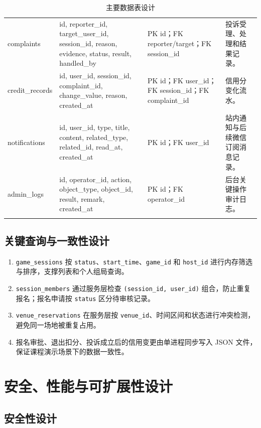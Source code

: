 \documentclass[a4paper]{article}
\begin{document}
\begin{longtable}{P{3.2cm} P{5.4cm} P{4.0cm} P{3.0cm}}
  complaints & id, reporter\_id, target\_user\_id, session\_id, reason, evidence, status, result, handled\_by & PK id；FK reporter/target；FK session\_id & 投诉受理、处理和结果记录。 \\
  credit\_records & id, user\_id, session\_id, complaint\_id, change\_value, reason, created\_at & PK id；FK user\_id；FK session\_id；FK complaint\_id & 信用分变化流水。 \\
  notifications & id, user\_id, type, title, content, related\_type, related\_id, read\_at, created\_at & PK id；FK user\_id & 站内通知与后续微信订阅消息记录。 \\
  admin\_logs & id, operator\_id, action, object\_type, object\_id, result, remark, created\_at & PK id；FK operator\_id & 后台关键操作审计日志。 \\
  \bottomrule
  \caption{主要数据表设计}
\end{longtable}

\subsection{关键查询与一致性设计}

\begin{enumerate}
  \item \texttt{game\_sessions} 按 \texttt{status}、\texttt{start\_time}、\texttt{game\_id} 和 \texttt{host\_id} 进行内存筛选与排序，支撑列表和个人组局查询。
  \item \texttt{session\_members} 通过服务层检查 \texttt{(session\_id, user\_id)} 组合，防止重复报名；报名申请按 \texttt{status} 区分待审核记录。
  \item \texttt{venue\_reservations} 在服务层按 \texttt{venue\_id}、时间区间和状态进行冲突检测，避免同一场地被重复占用。
  \item 报名审批、退出扣分、投诉成立后的信用变更由单进程同步写入 JSON 文件，保证课程演示场景下的数据一致性。
\end{enumerate}

\section{安全、性能与可扩展性设计}

\subsection{安全性设计}
\end{document}
